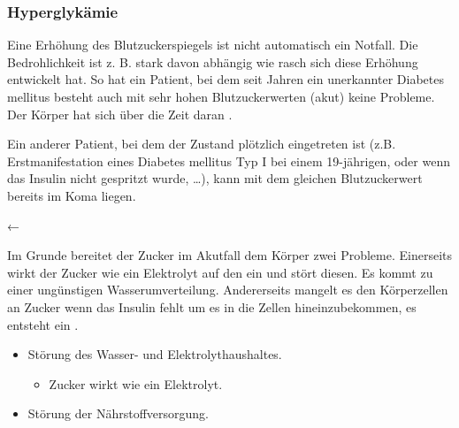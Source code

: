 \subsubsection{Hyperglykämie}
\label{topic:hyperglykaemie}



{
Eine Erhöhung des Blutzuckerspiegels ist nicht automatisch ein Notfall. Die
Bedrohlichkeit ist z. B. stark davon abhängig wie
rasch sich diese Erhöhung entwickelt hat. So hat ein
Patient, bei dem seit Jahren ein unerkannter Diabetes mellitus besteht auch mit sehr hohen Blutzuckerwerten (akut) keine
Probleme. Der Körper hat sich über die Zeit daran . 

Ein anderer
Patient, bei dem der Zustand plötzlich eingetreten ist (z.B.
Erstmanifestation eines Diabetes mellitus Typ I bei einem 19-jährigen, oder wenn
das Insulin nicht gespritzt wurde, \ldots), kann mit dem gleichen
Blutzuckerwert bereits im Koma liegen. 

 }
{←}
{}{}{}



{
Im Grunde bereitet der Zucker im Akutfall dem Körper zwei
Probleme. Einerseits wirkt der Zucker wie ein Elektrolyt auf den  ein und
stört diesen. Es kommt zu einer ungünstigen Wasserumverteilung. Andererseits
mangelt es den Körperzellen an Zucker wenn das Insulin fehlt um es in die
Zellen hineinzubekommen, es entsteht ein .
}{
\begin{itemize}
  \item Störung des Wasser- und Elektrolythaushaltes.
  \begin{itemize}
    \item Zucker wirkt wie ein Elektrolyt.
  \end{itemize}
  \item Störung der Nährstoffversorgung.
\end{itemize}
}{}{}{}

